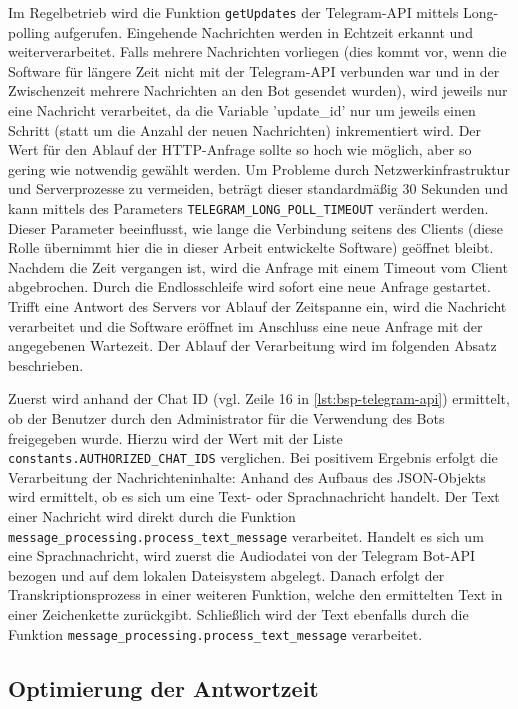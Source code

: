 Im Regelbetrieb wird die Funktion \lstinline{getUpdates} der Telegram-API mittels Long-polling aufgerufen. Eingehende Nachrichten werden in Echtzeit erkannt und weiterverarbeitet. Falls mehrere Nachrichten vorliegen (dies kommt vor, wenn die Software für längere Zeit nicht mit der Telegram-API verbunden war und in der Zwischenzeit mehrere Nachrichten an den Bot gesendet wurden), wird jeweils nur eine Nachricht verarbeitet, da die Variable 'update\_id' nur um jeweils einen Schritt (statt um die Anzahl der neuen Nachrichten) inkrementiert wird. Der Wert für den Ablauf der HTTP-Anfrage sollte so hoch wie möglich, aber so gering wie notwendig gewählt werden. Um Probleme durch Netzwerkinfrastruktur und Serverprozesse zu vermeiden, beträgt dieser standardmäßig 30 Sekunden \cite[Abs. 5.5. Timeouts]{rfc6202} und kann mittels des Parameters \lstinline{TELEGRAM_LONG_POLL_TIMEOUT} verändert werden. Dieser Parameter beeinflusst, wie lange die Verbindung seitens des Clients (diese Rolle übernimmt hier die in dieser Arbeit entwickelte Software) geöffnet bleibt. Nachdem die Zeit vergangen ist, wird die Anfrage mit einem Timeout vom Client abgebrochen. Durch die Endlosschleife wird sofort eine neue Anfrage gestartet. Trifft eine Antwort des Servers vor Ablauf der Zeitspanne ein, wird die Nachricht verarbeitet und die Software eröffnet im Anschluss eine neue Anfrage mit der angegebenen Wartezeit. Der Ablauf der Verarbeitung wird im folgenden Absatz beschrieben.

Zuerst wird anhand der Chat ID (vgl. Zeile 16 in \autoref{lst:bsp-telegram-api}) ermittelt, ob der Benutzer durch den Administrator für die Verwendung des Bots freigegeben wurde. Hierzu wird der Wert mit der Liste \lstinline{constants.AUTHORIZED_CHAT_IDS} verglichen. Bei positivem Ergebnis erfolgt die Verarbeitung der Nachrichteninhalte: Anhand des Aufbaus des JSON-Objekts wird ermittelt, ob es sich um eine Text- oder Sprachnachricht handelt. Der Text einer Nachricht wird direkt durch die Funktion \lstinline{message_processing.process_text_message} verarbeitet. Handelt es sich um eine Sprachnachricht, wird zuerst die Audiodatei von der Telegram Bot-API bezogen und auf dem lokalen Dateisystem abgelegt. Danach erfolgt der Transkriptionsprozess in einer weiteren Funktion, welche den ermittelten Text in einer Zeichenkette zurückgibt. Schließlich wird der Text ebenfalls durch die Funktion \lstinline{message_processing.process_text_message} verarbeitet.

\subsection{Optimierung der Antwortzeit}

